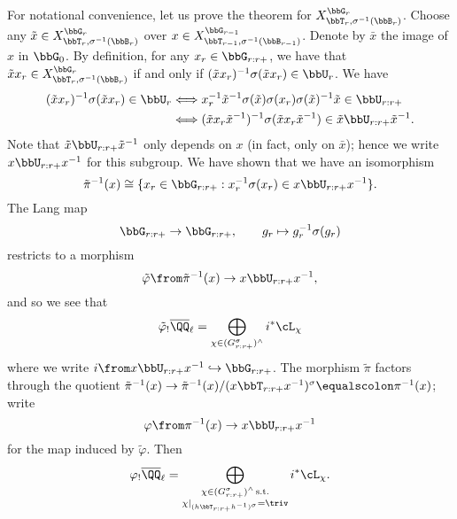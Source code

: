 For notational convenience, let us prove the theorem for $X_{\bbT_r,\sigma^{-1}(\bbB_r)}^{\bbG_r}$. Choose any $\tilde x \in X_{\bbT_r,\sigma^{-1}(\bbB_r)}^{\bbG_r}$ over $x \in X_{\bbT_{r-1},\sigma^{-1}(\bbB_{r-1})}^{\bbG_{r-1}}$. Denote by $\bar x$ the image of $x$ in $\bbG_0$. By definition, for any $x_r \in\bbG_{r:r+}$, we have that $\tilde x x_r \in X_{\bbT_r,\sigma^{-1}(\bbB_r)}^{\bbG_r}$ if and only if $(\tilde x x_r)^{-1} \sigma(\tilde x x_r) \in \bbU_r$. We have
\begin{align*}
  (\tilde x x_r)^{-1} \sigma(\tilde x x_r) \in \bbU_r 
  &\Longleftrightarrow x_r^{-1} \tilde x^{-1} \sigma(\tilde x) \sigma(x_r) \sigma(\tilde x)^{-1} \tilde x \in \bbU_{r:r+} \\
  &\Longleftrightarrow (\tilde x x_r \tilde x^{-1})^{-1} \sigma(\tilde x x_r \tilde x^{-1}) \in \tilde x \bbU_{r:r+} \tilde x^{-1}.
\end{align*}
Note that $\tilde x \bbU_{r:r+} \tilde x^{-1}$ only depends on $x$ (in fact, only on $\bar x$); hence we write $x \bbU_{r:r+} x^{-1}$ for this subgroup. We have shown that we have an isomorphism
\begin{equation*}
  \tilde \pi^{-1}(x) \cong \{x_r \in\bbG_{r:r+} : x_r^{-1} \sigma(x_r) \in x \bbU_{r:r+} x^{-1}\}.
\end{equation*}
The Lang map
\begin{equation*}
  \bbG_{r:r+} \to\bbG_{r:r+}, \qquad g_r \mapsto g_r^{-1} \sigma(g_r)
\end{equation*}
restricts to a morphism
\begin{equation*}
  \tilde \varphi \from \tilde \pi^{-1}(x) \to x \bbU_{r:r+} x^{-1},
\end{equation*}
and so we see that
\begin{equation*}
  \tilde \varphi_! \overline \QQ_\ell = \bigoplus_{\chi \in (G_{r:r+}^\sigma)^\wedge} i^* \cL_\chi
\end{equation*}
where we write $i \from x \bbU_{r:r+} x^{-1} \hookrightarrow\bbG_{r:r+}$. The morphism $\tilde \pi$ factors through the quotient $\tilde \pi^{-1}(x) \to \tilde \pi^{-1}(x)/(x\bbT_{r:r+} x^{-1})^\sigma \equalscolon \pi^{-1}(x)$; write
\begin{equation*}
  \varphi \from \pi^{-1}(x) \to x \bbU_{r:r+} x^{-1}
\end{equation*}
for the map induced by $\tilde \varphi$. Then 
\begin{equation*}
  \varphi_! \overline \QQ_\ell = \bigoplus_{\substack{\chi \in (G_{r:r+}^\sigma)^\wedge\, \text{s.t.} \\ \chi|_{(h\bbT_{r:r+}h^{-1})^\sigma} = \triv}} i^* \cL_\chi.
\end{equation*}
